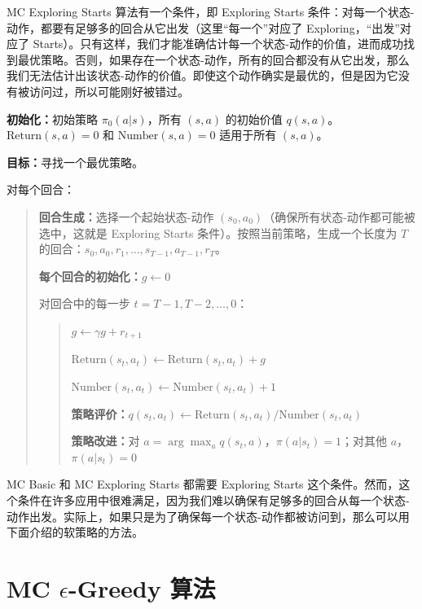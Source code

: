 MC Exploring Starts 算法有一个条件，即 Exploring Starts 条件：对每一个状态-动作，都要有足够多的回合从它出发（这里“每一个”对应了 Exploring，“出发”对应了 Starts）。只有这样，我们才能准确估计每一个状态-动作的价值，进而成功找到最优策略。否则，如果存在一个状态-动作，所有的回合都没有从它出发，那么我们无法估计出该状态-动作的价值。即使这个动作确实是最优的，但是因为它没有被访问过，所以可能刚好被错过。

\begin{algo}
\label{alg:rl-mc-es}
\textbf{初始化：}初始策略 $\pi_{0}(a|s)$，所有 $(s,a)$ 的初始价值 $q(s,a)$。$\mathrm{Return}(s,a) = 0$ 和 $\mathrm{Number}(s,a) = 0$ 适用于所有 $(s,a)$。

\textbf{目标：}寻找一个最优策略。

\medskip
对每个回合：
\begin{quote}
\textbf{回合生成：}选择一个起始状态-动作 $(s_{0}, a_{0})$（确保所有状态-动作都可能被选中，这就是 Exploring Starts 条件）。按照当前策略，生成一个长度为 $T$ 的回合：$s_{0}, a_{0}, r_{1}, \ldots, s_{T-1}, a_{T-1}, r_{T}$。

\textbf{每个回合的初始化：}$g \leftarrow 0$

对回合中的每一步 $t = T-1, T-2, \ldots, 0$：
\begin{quote}
$g \leftarrow \gamma g + r_{t+1}$

$\mathrm{Return}(s_{t}, a_{t}) \leftarrow \mathrm{Return}(s_{t}, a_{t}) + g$

$\mathrm{Number}(s_{t}, a_{t}) \leftarrow \mathrm{Number}(s_{t}, a_{t}) + 1$

\textbf{策略评价：}$q(s_{t}, a_{t}) \leftarrow \mathrm{Return}(s_{t}, a_{t}) / \mathrm{Number}(s_{t}, a_{t})$

\textbf{策略改进：}对 $a = \arg\max_{a} q(s_{t}, a)$，$\pi(a|s_{t}) = 1$；对其他 $a$，$\pi(a|s_{t}) = 0$
\end{quote}
\end{quote}
\end{algo}

MC Basic 和 MC Exploring Starts 都需要 Exploring Starts 这个条件。然而，这个条件在许多应用中很难满足，因为我们难以确保有足够多的回合从每一个状态-动作出发。实际上，如果只是为了确保每一个状态-动作都被访问到，那么可以用下面介绍的软策略的方法。

\section{MC \texorpdfstring{$\epsilon$}{epsilon}-Greedy 算法}
\label{sec:rl-mc-epsilon-greedy}

